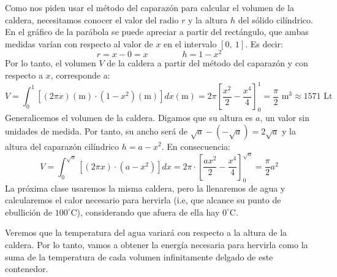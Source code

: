 \documentclass[12pt]{article}
\begin{document}
Como nos piden usar el método del caparazón para calcular el volumen de la caldera, necesitamos conocer el valor del radio $r$ y la altura $h$ del sólido cilíndrico. En el gráfico de la parábola se puede apreciar a partir del rectángulo, que ambas medidas varían con respecto al valor de $x$ en el intervalo $[0, \ 1]$. Es decir:
\[
  r = x - 0 = x \qquad \qquad h = 1 - x^{2}
\]
Por lo tanto, el volumen $V$ de la caldera a partir del método del caparazón y con respecto a $x$, corresponde a:
\[
  V = \int_{0}^{1} [(2 \pi x) (\text{m}) \cdot (1 - x^{2}) (\text{m})]dx (\text{m})
    = 2 \pi \left[\frac{x^{2}}{2} - \frac{x^{4}}{4}\right]_{0}^{1}
    = \frac{\pi}{2} \text{ m}^{3}
    \approx 1571 \text{ Lt}
\]
Generalicemos el volumen de la caldera. Digamos que su altura es $a$, un valor sin unidades de medida. Por tanto, su ancho será de $\sqrt{a} - (-\sqrt{a}) = 2\sqrt{a}$ y la altura del caparazón cilíndrico $h = a - x^{2}$. En consecuencia:
\[
V = \int_{0}^{\sqrt{a}} [(2 \pi x) \cdot (a - x^{2})]dx
  = 2 \pi \cdot \left[\frac{ax^{2}}{2} - \frac{x^{4}}{4}\right]_{0}^{\sqrt{a}}
  = \frac{\pi}{2} a^{2}
\]
La próxima clase usaremos la misma caldera, pero la llenaremos de agua y calcularemos el calor necesario para hervirla (i.e, que alcance su punto de ebullición de $100^{\circ}$C), considerando que afuera de ella hay $0^{\circ}$C.

Veremos que la temperatura del agua variará con respecto a la altura de la caldera. Por lo tanto, vamos a obtener la energía necesaria para hervirla como la suma de la temperatura de cada volumen infinitamente delgado de este contenedor.
\end{document}
